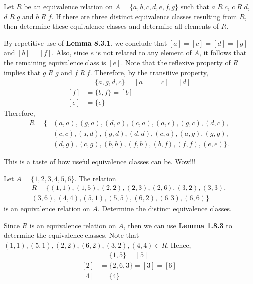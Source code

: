 \documentclass[12pt]{article}
\newenvironment{problem}[2][Problem]{\begin{trivlist}
		\item[\hskip \labelsep {\bfseries #1}\hskip \labelsep {\bfseries #2.}]}{\end{trivlist}}
\newenvironment{solution}[2][Solution]{\begin{trivlist}
		\item[\hskip \labelsep {\bfseries #1}\hskip \labelsep {\bfseries #2.}]}{\end{trivlist}}
\begin{document}
	\begin{problem}{24}
		Let $R$ be an equivalence relation on $A=\{a,b,c,d,e,f,g\}$ such that $a\; R \; c$, $c\; R \; d$, $d\; R \; g$ and $b\; R \;f$. If there are three distinct equivalence classes resulting from $R$, then determine these equivalence classes and determine all elements of $R$.
		\begin{solution}{24}
			By repetitive use of \textbf{Lemma 8.3.1}, we conclude that $[a]=[c]=[d]=[g]$ and $[b]=[f]$. Also, since $e$ is not related to any element of $A$, it follows that the remaining equivalence class is $[e]$. Note that the reflexive property of $R$ implies that $g\; R \; g$ and $f\; R\; f$. Therefore, by the transitive property,
			\begin{align*}
				[g] &= \{a,g,d,c\} = [a] = [c]= [d]\\
				[f] &= \{b,f\} =[b]\\
				[e] &= \{e\} 
			\end{align*}
		Therefore, 
		\begin{align*}
			R = \{&(a,a),(g,a),(d,a),(c,a),(a,c),(g,c),(d,c),\\
			&(c,c),(a,d),(g,d),(d,d),(c,d),(a,g),(g,g),\\
			&(d,g),(c,g),(b,b),(f,b),(b,f),(f,f),(e,e)\}.
		\end{align*}
		
		This is a taste of how useful equivalence classes can be. Wow!!!
		\end{solution}
	\end{problem}
	
	\begin{problem}{25}
		Let $A = \{1,2,3,4,5,6\}$. The relation
		\begin{align*}
			R=\{(1,1),(1,5),(2,2),(2,3),(2,6),(3,2),(3,3),\\
			(3,6), (4,4),(5,1),(5,5),(6,2),(6,3),(6,6)\}
		\end{align*}
		is an equivalence relation on $A$. Determine the distinct equivalence classes.
		\begin{solution}{25}
			Since $R$ is an equivalence relation on $A$, then we can use \textbf{Lemma 1.8.3} to determine the equivalence classes. Note that $(1,1),(5,1),(2,2),(6,2),(3,2),(4,4)\in R$. Hence,
			\begin{align*}
				[1] &= \{1,5\} = [5]\\
				[2] &= \{2,6,3\} = [3] = [6]\\
				[4] &= \{4\} 
			\end{align*}
		\end{solution}
	\end{problem}
\end{document}
